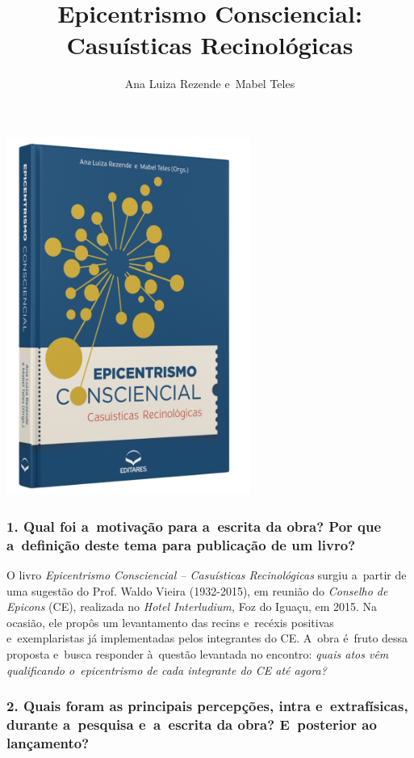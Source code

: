 \documentclass{gescons}
\author{Ana Luiza Rezende e~Mabel Teles}
\title{Epicentrismo Consciencial: Casuísticas Recinológicas}
\begin{document}
    \makeentrevistatitle

    \begin{multicols}{2}


\begin{center}
    \includegraphics[width=8cm]{articles/entrevista/mockups/Mabel-e-Ana-Luiza.png}
\end{center}

\subsubsection{1. Qual foi a~motivação para a~escrita da obra? Por que a~definição deste tema para publicação de um livro?}


O livro \textit{Epicentrismo Consciencial – Casuísticas Recinológicas} surgiu a~partir de uma sugestão do Prof. Waldo Vieira (1932-2015), em reunião do \textit{Conselho de Epicons} (CE), realizada no \textit{Hotel Interludium,} Foz do Iguaçu, em 2015. Na ocasião, ele propôs um levantamento das recins e~recéxis positivas e~exemplaristas já implementadas pelos integrantes do CE. A~obra é~fruto dessa proposta e~busca responder à~questão levantada no encontro: \textit{quais atos vêm qualificando o~epicentrismo de cada integrante do CE até agora? }

\subsubsection{2. Quais foram as principais percepções, intra e~extrafísicas, durante a~pesquisa e~a~escrita da obra? E~posterior ao lançamento?}


\end{multicols}
\end{document}
